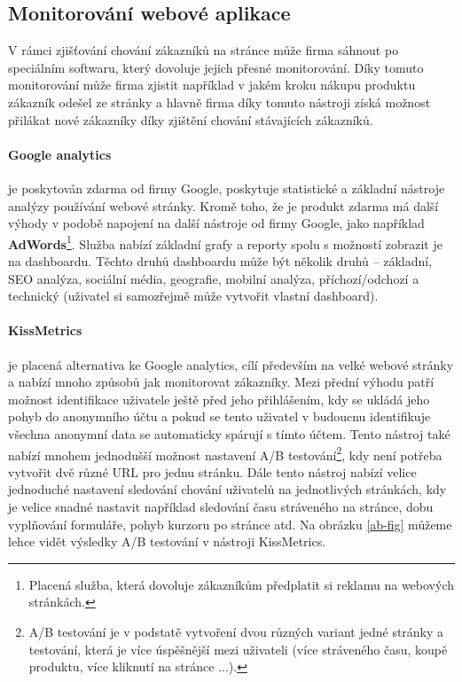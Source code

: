 \subsection{Monitorování webové aplikace}
\par V rámci zjišťování chování zákazníků na stránce může firma sáhnout po speciálním softwaru, který dovoluje jejich přesné monitorování. Díky tomuto monitorování může firma zjistit například v jakém kroku nákupu produktu zákazník odešel ze stránky a hlavně firma díky tomuto nástroji získá možnost přilákat nové zákazníky díky zjištění chování stávajících zákazníků. \cite{the-ux-book}

\paragraph{Google analytics} je poskytován zdarma od firmy Google, poskytuje statistické a základní nástroje analýzy používání webové stránky. Kromě toho, že je produkt zdarma má další výhody v podobě napojení na další nástroje od firmy Google, jako například \textbf{AdWords}\footnote{Placená služba, která dovoluje zákazníkům předplatit si reklamu na webových stránkách.}. Služba nabízí základní grafy a reporty spolu s možností zobrazit je na dashboardu. Těchto druhů dashboardu může být několik druhů -- základní, SEO analýza, sociální média, geografie, mobilní analýza, příchozí/odchozí a technický (uživatel si samozřejmě může vytvořit vlastní dashboard).

\paragraph{KissMetrics} je placená alternativa ke Google analytics, cílí především na velké webové stránky a nabízí mnoho způsobů jak monitorovat zákazníky. Mezi přední výhodu patří možnost identifikace uživatele ještě před jeho přihlášením, kdy se ukládá jeho pohyb do anonymního účtu a pokud se tento uživatel v budoucnu identifikuje všechna anonymní data se automaticky spárují s tímto účtem. Tento nástroj také nabízí mnohem jednodušší možnost nastavení A/B testování\footnote{A/B testování je v podstatě vytvoření dvou různých variant jedné stránky a testování, která je více úspěšnější mezi uživateli (více stráveného času, koupě produktu, více kliknutí na stránce ...).}, kdy není potřeba vytvořit dvě různé URL pro jednu stránku. Dále tento nástroj nabízí velice jednoduché nastavení sledování chování uživatelů na jednotlivých stránkách, kdy je velice snadné nastavit například sledování času stráveného na stránce, dobu vyplňování formuláře, pohyb kurzoru po stránce atd. Na obrázku \ref{ab-fig} můžeme lehce vidět výsledky A/B testování v nástroji KissMetrics.

